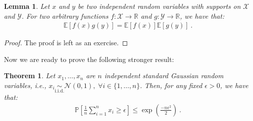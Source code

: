 \documentclass[11pt]{article}
\newtheorem{theorem}{Theorem}
\newtheorem{lemma}{Lemma}
\newcommand{\real}{\mathbb{R}}
\newcommand{\E}[1]{\mathbb{E}\left[ #1 \right]}
\newcommand{\prob}[1]{\mathbb{P}\left[ #1 \right]}
\newcommand{\calX}{\mathcal{X}}
\begin{document}
\begin{lemma}
    \label{lem:independent functions}
    Let $x$ and $y$ be two independent random variables with supports on $\calX$ and $\mathcal{Y}$. For two arbitrary functions $f:\calX \to \real$ and $g:\mathcal{Y} \to \real$, we have that:
    \begin{align}
        \label{eq: independent functions}
        \E{f(x)g(y)} = \E{f(x)}\E{g(y)}~.
    \end{align}
\end{lemma}
\begin{proof}
    The proof is left as an exercise.
\end{proof}
Now we are ready to prove the following stronger result:
\begin{theorem}
    \label{thm: one sided gaussian bound}
    Let $x_1,\ldots,x_n$ are $n$ independent standard Gaussian random variables, i.e., $x_i \underset{\text{i.i.d.}}\sim \mathcal{N}(0, 1),\; \forall i \in \{1,\ldots,n\}$. Then, for any fixed $\epsilon > 0$, we have that:
    \begin{align}
        \label{eq: one sided gaussian bound}
        \prob{\frac{1}{n} \sum_{i=1}^n x_i \geq \epsilon} \leq \exp\left( \frac{-n\epsilon^2}{2} \right)~.
    \end{align}
\end{theorem}
\end{document}
